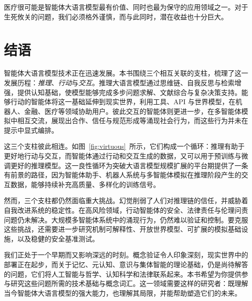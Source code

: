 医疗很可能是智能体大语言模型最有价值、同时也最为保守的应用领域之一。对于生死攸关的问题，我们必须格外谨慎，而与此同时，潜在收益也十分巨大。



\section{结语}

智能体大语言模型技术正在迅速发展。本书围绕三个相互关联的支柱，梳理了这一发展历程：\emph{推理}、\emph{行动}与\emph{交互}。推理大语言模型通过思维链、自我反思与检索增强，提供认知基础，使模型能够完成多步问题求解、文献综合与复杂决策支持。能够行动的智能体将这一基础延伸到现实世界，利用工具、API 与世界模型，在机器人、金融、医疗等领域协助用户。彼此交互的智能体则更进一步，在多智能体模拟中相互交流，展现出合作、信任与规范形成等涌现社会行为，而这些行为并未在提示中显式编排。

这三个支柱彼此相连。如图~\ref{fig:virtuous}~所示，它们构成一个循环：推理有助于更好地行动与交互，而智能体通过行动和交互生成的数据，又可以用于预训练与微调更好的推理模型。这一良性循环为突破大语言模型规模扩展的平台期提供了一条有前景的路径，因为智能体助手、机器人系统与多智能体模拟在推理阶段产生的交互数据，能够持续补充高质量、多样化的训练信号。

然而，三个支柱都仍然面临重大挑战。幻觉削弱了人们对推理链的信任，并威胁着自我改进系统的稳定性。在高风险领域，行动智能体的安全、法律责任与伦理问责问题仍未解决。大规模多智能体系统中的涌现行为，仍然难以验证和控制。要克服这些挑战，还需要进一步研究机制可解释性、开放世界模型、可扩展的模拟基础设施，以及稳健的安全基准测试。

我们正处于一个早期而又影响深远的时刻。概念验证令人印象深刻，现实世界中的部署正在起步，而关于记忆、元认知、意识与集体智能的理论基础，仍是尚待解答的问题，它们将人工智能与哲学、认知科学和法律联系起来。本书希望为你提供参与研究这些问题所需的技术基础与概念词汇。这一领域需要这样的研究者：既理解当今智能体大语言模型的强大能力，也理解其局限，并能帮助塑造它们的未来。








